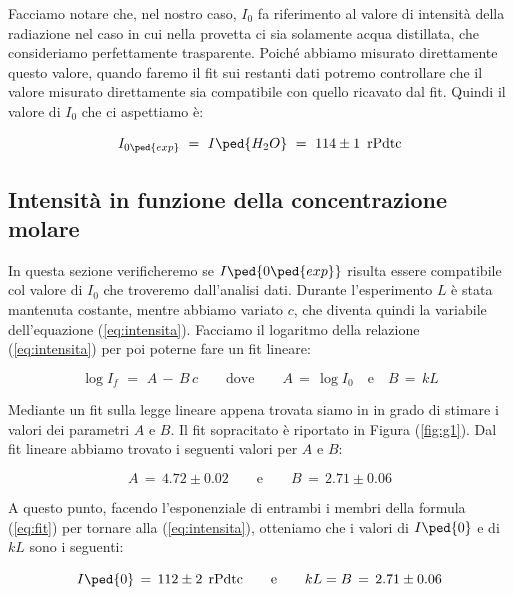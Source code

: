 Facciamo notare che, nel nostro caso, $I_0$ fa riferimento al valore di intensità della radiazione nel caso in cui nella provetta ci sia solamente acqua distillata, che consideriamo perfettamente trasparente. Poiché abbiamo misurato direttamente questo valore,
quando faremo il fit sui restanti dati potremo controllare che il valore misurato direttamente sia compatibile con quello ricavato dal fit.
Quindi il valore di $I_0$ che ci aspettiamo è:

\begin{equation}
	I_{0\ped{exp}} \,\,=\,\, I\ped{H_2O} \,\,=\,\, 114 \pm 1 \,\,\, \text{rPdtc}
\end{equation}

\subsection{Intensità in funzione della concentrazione molare}

In questa sezione verificheremo se $I\ped{0\ped{exp}}$ risulta essere compatibile col valore di $I_0$ che troveremo dall'analisi dati.
Durante l'esperimento $L$ è stata mantenuta costante, mentre abbiamo variato $c$, che diventa quindi la variabile dell'equazione
(\ref{eq:intensita}). Facciamo il logaritmo della relazione (\ref{eq:intensita}) per poi poterne fare un fit lineare:

\begin{equation}
	\log{I_f} \,\,=\,\, A \,-\, B \, c \qquad \text{dove} \qquad A \,=\, \log{I_0} \quad \text{e} \quad B\,=\, kL
	\label{eq:fit}
\end{equation}

Mediante un fit sulla legge lineare appena trovata siamo in in grado di stimare i valori dei parametri
$A$ e $B$. Il fit sopracitato è riportato in Figura (\ref{fig:g1}). Dal fit lineare abbiamo trovato i seguenti valori per $A$ e $B$:

\begin{equation*}
	A \,=\, 4.72 \pm 0.02 \qquad \text{e} \qquad B \,=\, 2.71 \pm 0.06
\end{equation*}

A questo punto, facendo l'esponenziale di entrambi i membri della formula (\ref{eq:fit}) per tornare alla (\ref{eq:intensita}),
otteniamo che i valori di $I\ped{0}$ e di $kL$ sono i seguenti:

\begin{equation}
	I\ped{0} \,=\, 112 \pm 2 \;\, \text{rPdtc} \qquad \text{e} \qquad kL = B \,=\, 2.71 \pm 0.06
\end{equation}

